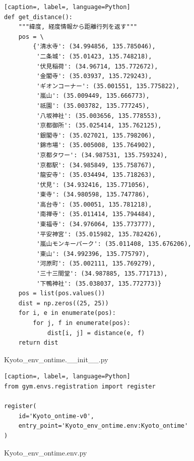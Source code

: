 \documentclass[a4paper,12pt]{jsreport}
\theoremstyle{definition}
\begin{document}
\begin{lstlisting}[caption=, label=, language=Python]
def get_distance():
    """緯度, 経度情報から距離行列を返す"""
    pos = \
        {'清水寺': (34.994856, 135.785046),
         '二条城': (35.01423, 135.748218),
         '伏見稲荷': (34.96714, 135.772672),
         '金閣寺': (35.03937, 135.729243),
         'ギオンコーナー': (35.001551, 135.775822),
         '嵐山': (35.009449, 135.666773),
         '祇園': (35.003782, 135.777245),
         '八坂神社': (35.003656, 135.778553),
         '京都御所': (35.025414, 135.762125),
         '銀閣寺': (35.027021, 135.798206),
         '錦市場': (35.005008, 135.764902),
         '京都タワー': (34.987531, 135.759324),
         '京都駅': (34.985849, 135.758767),
         '龍安寺': (35.034494, 135.718263),
         '伏見': (34.932416, 135.771056),
         '東寺': (34.980598, 135.747786),
         '高台寺': (35.00051, 135.781218),
         '南禅寺': (35.011414, 135.794484),
         '東福寺': (34.976064, 135.773777),
         '平安神宮': (35.015982, 135.782426),
         '嵐山モンキーパーク': (35.011408, 135.676206),
         '東山': (34.992396, 135.775797),
         '河原町': (35.002111, 135.769279),
         '三十三間堂': (34.987885, 135.771713),
         '下鴨神社': (35.038037, 135.772773)}
    pos = list(pos.values())
    dist = np.zeros((25, 25))
    for i, e in enumerate(pos):
        for j, f in enumerate(pos):
            dist[i, j] = distance(e, f)
    return dist
\end{lstlisting}
Kyoto\_env\_ontime.\_\_init\_\_.py
\begin{lstlisting}[caption=, label=, language=Python]
from gym.envs.registration import register

register(
    id='Kyoto_ontime-v0',
    entry_point='Kyoto_env_ontime.env:Kyoto_ontime'
)

\end{lstlisting}
Kyoto\_env\_ontime.env.py
\end{document}
